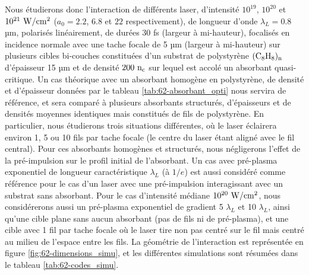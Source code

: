 \begin{refsection}
Nous étudierons donc l'interaction de différents laser, d'intensité $10^{19}$, $10^{20}$ et $10^{21} ~ \rm W/cm^2$ ($a_0=2.2$, $6.8$ et $22$ respectivement), de longueur d'onde $\lambda_L=0.8$ µm, polarisés linéairement, de durées 30 fs (largeur à mi-hauteur), focalisés en incidence normale avec une tache focale de 5 µm (largeur à mi-hauteur) sur plusieurs cibles bi-couches constituées d'un substrat de polystyrène $\rm (C_8 H_8)_n$ d'épaisseur 15 µm et de densité $200 ~ \rm n_c$ sur lequel est accolé un absorbant quasi-critique. Un cas théorique avec un absorbant homogène en polystyrène, de densité et d'épaisseur données par le tableau \ref{tab:62-absorbant_opti} nous servira de référence, et sera comparé à plusieurs absorbants structurés, d'épaisseurs et de densités moyennes identiques mais constitués de fils de polystyrène. En particulier, nous étudierons trois situations différentes, où le laser éclairera environ 1, 5 ou 10 fils par tache focale (le centre du laser étant aligné avec le fil central). Pour ces absorbants homogènes et structurés, nous négligerons l'effet de la pré-impulsion sur le profil initial de l'absorbant. Un cas avec pré-plasma exponentiel de longueur caractéristique $\lambda_L$ (à $1/e$) est aussi considéré comme référence pour le cas d'un laser avec une pré-impulsion interagissant avec un substrat sans absorbant. Pour le cas d'intensité médiane $10^{20} ~ \rm W/cm^2$, nous considérerons aussi un pré-plasma exponentiel de gradient 5 $\lambda_L$ et 10 $\lambda_L$, ainsi qu'une cible plane sans aucun absorbant (pas de fils ni de pré-plasma), et une cible avec 1 fil par tache focale où le laser tire non pas centré sur le fil mais centré au milieu de l'espace entre les fils. La géométrie de l'interaction est représentée en figure \ref{fig:62-dimensions_simu}, et les différentes simulations sont résumées dans le tableau \ref{tab:62-codes_simu}.


\end{refsection}
